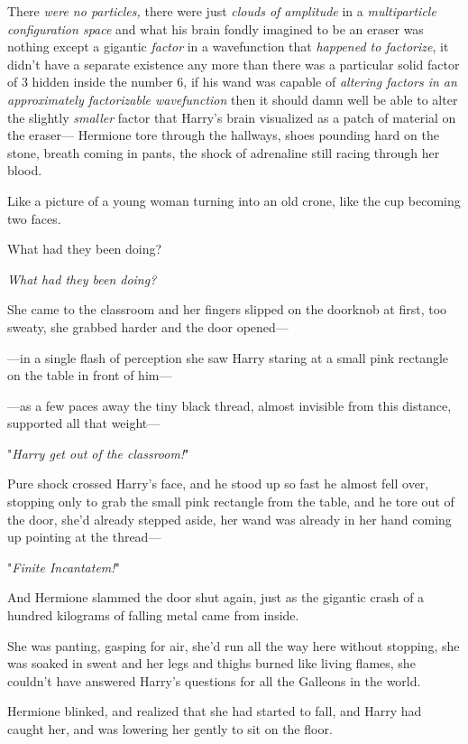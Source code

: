 There\emph{ were no particles,} there were just \emph{clouds of amplitude} in a 
\emph{multiparticle configuration space} and what his brain fondly imagined to 
be an eraser was nothing except a gigantic \emph{factor} in a wavefunction that 
\emph{happened to factorize}, it didn't have a separate existence any more than 
there was a particular solid factor of 3 hidden inside the number 6, if his 
wand was capable of \emph{altering factors in an approximately factorizable 
wavefunction} then it should damn well be able to alter the slightly 
\emph{smaller} factor that Harry's brain visualized as a patch of material on 
the eraser---
\sbreak
Hermione tore through the hallways, shoes pounding hard on the stone, breath 
coming in pants, the shock of adrenaline still racing through her blood.

Like a picture of a young woman turning into an old crone, like the cup 
becoming two faces.

What had they been doing?

\emph{What had they been doing?}

She came to the classroom and her fingers slipped on the doorknob at first, too 
sweaty, she grabbed harder and the door opened---

---in a single flash of perception she saw Harry staring at a small pink 
rectangle on the table in front of him---

---as a few paces away the tiny black thread, almost invisible from this 
distance, supported all that weight---

"\emph{Harry get out of the classroom!}"

Pure shock crossed Harry's face, and he stood up so fast he almost fell over, 
stopping only to grab the small pink rectangle from the table, and he tore out 
of the door, she'd already stepped aside, her wand was already in her hand 
coming up pointing at the thread---

"\emph{Finite Incantatem!}"

And Hermione slammed the door shut again, just as the gigantic crash of a 
hundred kilograms of falling metal came from inside.

She was panting, gasping for air, she'd run all the way here without stopping, 
she was soaked in sweat and her legs and thighs burned like living flames, she 
couldn't have answered Harry's questions for all the Galleons in the world.

Hermione blinked, and realized that she had started to fall, and Harry had 
caught her, and was lowering her gently to sit on the floor.

